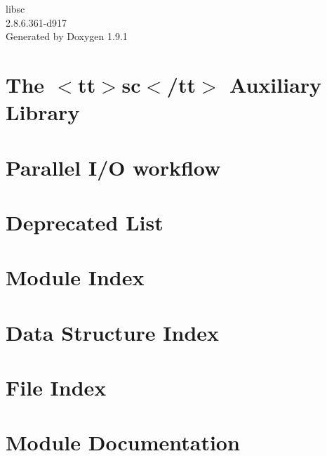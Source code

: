 \let\mypdfximage\pdfximage\def\pdfximage{\immediate\mypdfximage}\documentclass[twoside]{book}
\newcommand{\+}{\discretionary{\mbox{\scriptsize$\hookleftarrow$}}{}{}}
\newcommand{\clearemptydoublepage}{%
  \newpage{\pagestyle{empty}\cleardoublepage}%
}
\begin{document}
\raggedbottom

\hypersetup{pageanchor=false,
             bookmarksnumbered=true,
             pdfencoding=unicode
            }
\begin{titlepage}
\vspace*{7cm}
\begin{center}%
{\Large libsc \\[1ex]\large 2.\+8.\+6.\+361-\/d917 }\\
\vspace*{1cm}
{\large Generated by Doxygen 1.9.1}\\
\end{center}
\end{titlepage}
\clearemptydoublepage
{}
\tableofcontents
\clearemptydoublepage
{}
\hypersetup{pageanchor=true}

\chapter{The $<$tt$>$sc$<$/tt$>$ Auxiliary Library}
\label{index}\hypertarget{index}{}
\chapter{Parallel I/O workflow}
\label{scda_workflow}

\chapter{Deprecated List}
\label{deprecated}

\chapter{Module Index}

\chapter{Data Structure Index}

\chapter{File Index}

\chapter{Module Documentation}






\end{document}
